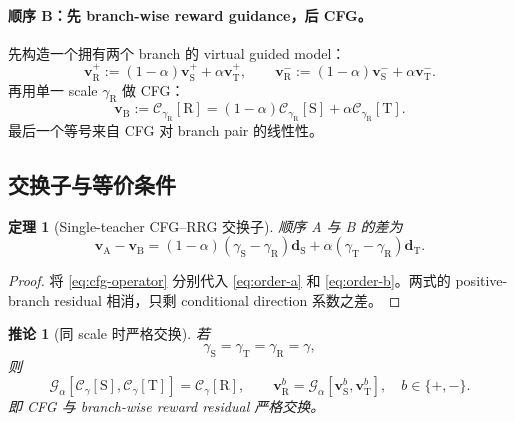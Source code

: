 \documentclass[11pt,a4paper]{article}
\newcommand{\C}{\mathcal{C}}
\newcommand{\G}{\mathcal{G}}
\newcommand{\vfield}{\bm{v}}
\newcommand{\student}{\mathrm{S}}
\newcommand{\teacher}{\mathrm{T}}
\newcommand{\pos}{+}
\newcommand{\negbranch}{-}
\theoremstyle{definition}
\theoremstyle{plain}
\newtheorem{theorem}[definition]{定理}
\newtheorem{corollary}[definition]{推论}
\begin{document}
\paragraph{顺序 B：先 branch-wise reward guidance，后 CFG。}
先构造一个拥有两个 branch 的 virtual guided model：
\begin{equation}
  \vfield_{\mathrm{R}}^\pos
  :=
  (1-\alpha)\vfield_\student^\pos+\alpha\vfield_\teacher^\pos,
  \qquad
  \vfield_{\mathrm{R}}^\negbranch
  :=
  (1-\alpha)\vfield_\student^\negbranch+\alpha\vfield_\teacher^\negbranch.
  \label{eq:branchwise-rrg}
\end{equation}
再用单一 scale $\gamma_{\mathrm R}$ 做 CFG：
\begin{equation}
  \vfield_{\mathrm{B}}
  :=
  \C_{\gamma_{\mathrm R}}[\mathrm R]
  =
  (1-\alpha)\C_{\gamma_{\mathrm R}}[\student]
  +\alpha\C_{\gamma_{\mathrm R}}[\teacher].
  \label{eq:order-b}
\end{equation}
最后一个等号来自 CFG 对 branch pair 的线性性。

\subsection{交换子与等价条件}

\begin{theorem}[Single-teacher CFG--RRG 交换子]
顺序 A 与 B 的差为
\begin{equation}
\boxed{
  \vfield_{\mathrm A}-\vfield_{\mathrm B}
  =
  (1-\alpha)(\gamma_\student-\gamma_{\mathrm R})\bm d_\student
  +
  \alpha(\gamma_\teacher-\gamma_{\mathrm R})\bm d_\teacher.
}
\label{eq:single-commutator}
\end{equation}
\end{theorem}

\begin{proof}
将 \eqref{eq:cfg-operator} 分别代入 \eqref{eq:order-a} 和
\eqref{eq:order-b}。两式的 positive-branch residual 相消，只剩 conditional
direction 系数之差。
\end{proof}

\begin{corollary}[同 scale 时严格交换]
若
\begin{equation}
  \gamma_\student=\gamma_\teacher=\gamma_{\mathrm R}=\gamma,
  \label{eq:same-scale}
\end{equation}
则
\begin{equation}
  \G_\alpha[\C_\gamma[\student],\C_\gamma[\teacher]]
  =
  \C_\gamma[\mathrm R],
  \qquad
  \vfield_{\mathrm R}^{b}
  =
  \G_\alpha[\vfield_\student^{b},\vfield_\teacher^{b}],
  \quad b\in\{\pos,\negbranch\}.
  \label{eq:commute}
\end{equation}
即 CFG 与 branch-wise reward residual 严格交换。
\end{corollary}
\end{document}
